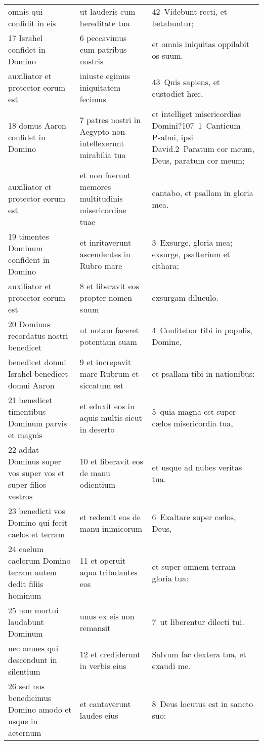 \documentclass{article}
\begin{document}
\begin{longtable}{@{}p{}p{}p{}@{}}
omnis qui confidit in eis	&	ut lauderis cum hereditate tua	&	42 Videbunt recti, et lætabuntur;	\\
17 Israhel confidet in Domino	&	6 peccavimus cum patribus nostris	&	et omnis iniquitas oppilabit os suum.	\\
auxiliator et protector eorum est	&	iniuste egimus iniquitatem fecimus	&	43 Quis sapiens, et custodiet hæc,	\\
18 domus Aaron confidet in Domino	&	7 patres nostri in Aegypto non intellexerunt mirabilia tua	&	et intelliget misericordias Domini?107 1 Canticum Psalmi, ipsi David.2 Paratum cor meum, Deus, paratum cor meum;	\\
auxiliator et protector eorum est	&	et non fuerunt memores multitudinis misericordiae tuae	&	cantabo, et psallam in gloria mea.	\\
19 timentes Dominum confident in Domino	&	et inritaverunt ascendentes in Rubro mare	&	3 Exsurge, gloria mea; exsurge, psalterium et cithara;	\\
auxiliator et protector eorum est	&	8 et liberavit eos propter nomen suum	&	exsurgam diluculo.	\\
20 Dominus recordatus nostri benedicet	&	ut notam faceret potentiam suam	&	4 Confitebor tibi in populis, Domine,	\\
benedicet domui Israhel benedicet domui Aaron	&	9 et increpavit mare Rubrum et siccatum est	&	et psallam tibi in nationibus:	\\
21 benedicet timentibus Dominum parvis et magnis	&	et eduxit eos in aquis multis sicut in deserto	&	5 quia magna est super cælos misericordia tua,	\\
22 addat Dominus super vos super vos et super filios vestros	&	10 et liberavit eos de manu odientium	&	et usque ad nubes veritas tua.	\\
23 benedicti vos Domino qui fecit caelos et terram	&	et redemit eos de manu inimicorum	&	6 Exaltare super cælos, Deus,	\\
24 caelum caelorum Domino terram autem dedit filiis hominum	&	11 et operuit aqua tribulantes eos	&	et super omnem terram gloria tua:	\\
25 non mortui laudabunt Dominum	&	unus ex eis non remansit	&	7 ut liberentur dilecti tui.	\\
nec omnes qui descendunt in silentium	&	12 et crediderunt in verbis eius	&	Salvum fac dextera tua, et exaudi me.	\\
26 sed nos benedicimus Domino amodo et usque in aeternum	&	et cantaverunt laudes eius	&	8 Deus locutus est in sancto suo:	\\

\end{longtable}
\end{document}
